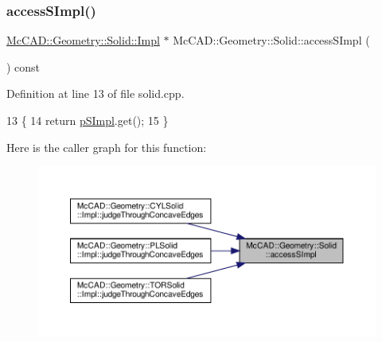 \mbox{\label{classMcCAD_1_1Geometry_1_1Solid_a41304db7cdf4762342ea833b15764180}} 
\subsubsection{\texorpdfstring{access\+S\+Impl()}{accessSImpl()}\hspace{0.1cm}{\footnotesize\ttfamily [1/2]}}
{\footnotesize\ttfamily \hyperlink{classMcCAD_1_1Geometry_1_1Solid_1_1Impl}{Mc\+C\+A\+D\+::\+Geometry\+::\+Solid\+::\+Impl} $\ast$ Mc\+C\+A\+D\+::\+Geometry\+::\+Solid\+::access\+S\+Impl (\begin{DoxyParamCaption}{ }\end{DoxyParamCaption}) const\hspace{0.3cm}{\ttfamily [inherited]}}



Definition at line 13 of file solid.\+cpp.


\begin{DoxyCode}
13                                      \{
14   \textcolor{keywordflow}{return} \hyperlink{classMcCAD_1_1Geometry_1_1Solid_a77640dab3831396c6527ead13c953614}{pSImpl}.get();
15 \}
\end{DoxyCode}
Here is the caller graph for this function\+:\nopagebreak
\begin{figure}[H]
\begin{center}
\leavevmode
\includegraphics[width=350pt]{d1/d65/classMcCAD_1_1Geometry_1_1Solid_a41304db7cdf4762342ea833b15764180_icgraph}
\end{center}
\end{figure}
\mbox{\label{classMcCAD_1_1Geometry_1_1Solid_a1d058cac2d5619e21813a16706dc1826}} 
